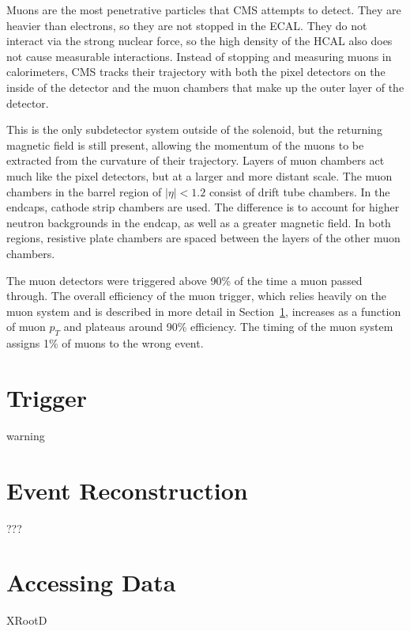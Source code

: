 Muons are the most penetrative particles that CMS attempts to detect.
They are heavier than electrons, so they are not stopped in the ECAL.
They do not interact via the strong nuclear force,
so the high density of the HCAL also does not cause measurable interactions.
Instead of stopping and measuring muons in calorimeters,
CMS tracks their trajectory with both the pixel detectors on the inside of the detector
and the muon chambers that make up the outer layer of the detector.

This is the only subdetector system outside of the solenoid,
but the returning magnetic field is still present,
allowing the momentum of the muons to be extracted from the curvature of their trajectory.
Layers of muon chambers act much like the pixel detectors, but at a larger and more distant scale.
The muon chambers in the barrel region of $|\eta| < 1.2$ consist of drift tube chambers.
In the endcaps, cathode strip chambers are used.
The difference is to account for higher neutron backgrounds in the endcap, as well as a greater magnetic field.
In both regions, resistive plate chambers are spaced between the layers of the other muon chambers.

The muon detectors were triggered above 90\% of the time a muon passed through.
The overall efficiency of the muon trigger, which relies heavily on the muon system
and is described in more detail in Section~\ref{sec:trigger},
increases as a function of muon $p_T$ and plateaus around 90\% efficiency.
The timing of the muon system assigns 1\% of muons to the wrong event\cite{Pozzobon_2019}.


\section{Trigger} \label{sec:trigger}

warning

\section{Event Reconstruction} \label{sec:event-reco}

???

\section{Accessing Data}

XRootD
